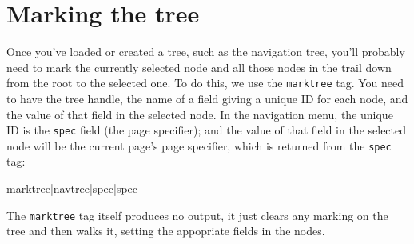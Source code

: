\section{Marking the tree}
\label{treemark}
Once you've loaded or created a tree, such as the navigation tree, you'll
probably need to mark the currently selected node and all those nodes in the
trail down from the root to the selected one. To do this, we use the
\texttt{marktree} tag. You need to have the tree handle, the name of a field
giving a unique ID for each node, and the value of that field in the selected
node. In the navigation menu, the unique ID is the \texttt{spec} field (the
page specifier); and the value of that field in the selected node will be the
current page's page specifier, which is returned from the \texttt{spec} tag:
\begin{MyVerbatim}
{{marktree|{{navtree}}|spec|{{spec}}}}
\end{MyVerbatim}
The \texttt{marktree} tag itself produces no output, it just clears any
marking on the tree and then walks it, setting the appopriate fields in the
nodes.

\clearpage
